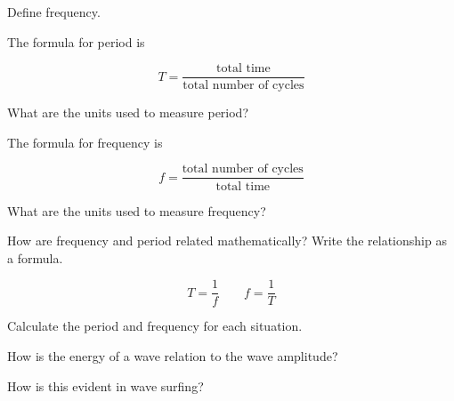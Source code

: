 \documentclass[]{exam}
\begin{document}
\begin{questions}
\question Define frequency.

\question
The formula for period is

\begin{equation*}
    T = \frac{\text{total time}}{\text{total number of cycles}}
\end{equation*}

What are the units used to measure period?

\question
The formula for frequency is

\begin{equation*}
    f = \frac{\text{total number of cycles}}{\text{total time}}
\end{equation*}

What are the units used to measure frequency?

\question
How are frequency and period related mathematically? Write the relationship as a formula.

\begin{solutionorbox}[2cm]
\begin{equation*}
    T = \frac{1}{f} \qquad f = \frac{1}{T}
\end{equation*}
\end{solutionorbox}

\question
Calculate the period and frequency for each situation.


\question 
How is the energy of a wave relation to the wave amplitude?

\question
How is this evident in wave surfing?


\end{questions}
\end{document}
